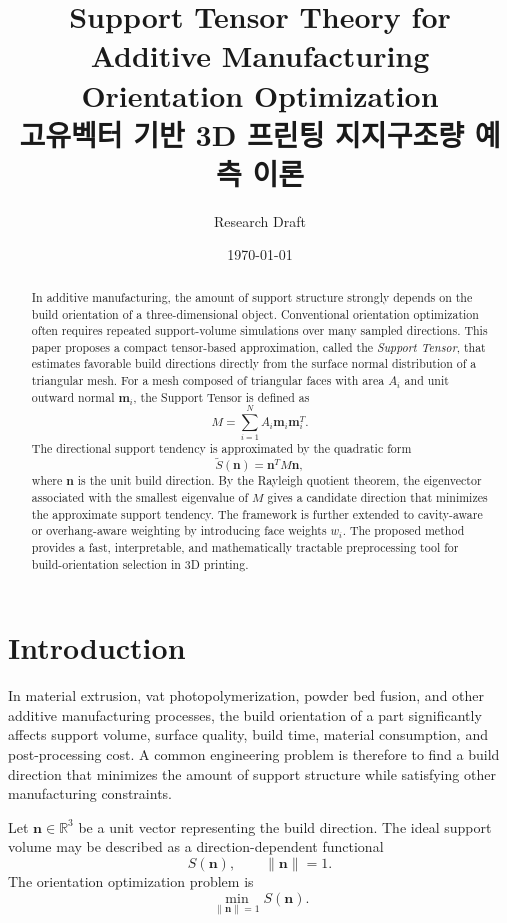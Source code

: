 \documentclass[11pt,a4paper]{article}
\title{
Support Tensor Theory for Additive Manufacturing Orientation Optimization\\
\large 고유벡터 기반 3D 프린팅 지지구조량 예측 이론
}
\author{
Research Draft
}
\date{\today}
\begin{document}
\maketitle

\begin{abstract}
In additive manufacturing, the amount of support structure strongly depends on the build orientation of a three-dimensional object.
Conventional orientation optimization often requires repeated support-volume simulations over many sampled directions.
This paper proposes a compact tensor-based approximation, called the \emph{Support Tensor}, that estimates favorable build directions directly from the surface normal distribution of a triangular mesh.
For a mesh composed of triangular faces with area $A_i$ and unit outward normal $\bm m_i$, the Support Tensor is defined as
\[
M = \sum_{i=1}^{N} A_i \bm m_i \bm m_i^T.
\]
The directional support tendency is approximated by the quadratic form
\[
\widetilde S(\bm n)=\bm n^T M \bm n,
\]
where $\bm n$ is the unit build direction.
By the Rayleigh quotient theorem, the eigenvector associated with the smallest eigenvalue of $M$ gives a candidate direction that minimizes the approximate support tendency.
The framework is further extended to cavity-aware or overhang-aware weighting by introducing face weights $w_i$.
The proposed method provides a fast, interpretable, and mathematically tractable preprocessing tool for build-orientation selection in 3D printing.
\end{abstract}

\section{Introduction}

In material extrusion, vat photopolymerization, powder bed fusion, and other additive manufacturing processes, the build orientation of a part significantly affects support volume, surface quality, build time, material consumption, and post-processing cost.
A common engineering problem is therefore to find a build direction that minimizes the amount of support structure while satisfying other manufacturing constraints.

Let $\bm n \in \mathbb R^3$ be a unit vector representing the build direction.
The ideal support volume may be described as a direction-dependent functional
\[
S(\bm n),
\qquad
\|\bm n\|=1.
\]
The orientation optimization problem is
\begin{equation}
\min_{\|\bm n\|=1} S(\bm n).
\label{eq:main_problem}
\end{equation}
\end{document}
